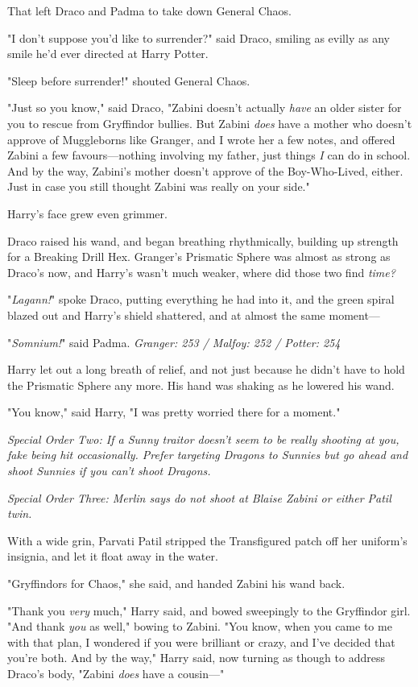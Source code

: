 That left Draco and Padma to take down General Chaos.

"I don't suppose you'd like to surrender?" said Draco, smiling as evilly as any
smile he'd ever directed at Harry Potter.

"Sleep before surrender!" shouted General Chaos.

"Just so you know," said Draco, "Zabini doesn't actually \emph{have} an older
sister for you to rescue from Gryffindor bullies. But Zabini \emph{does} have a
mother who doesn't approve of Muggleborns like Granger, and I wrote her a few
notes, and offered Zabini a few favours---nothing involving my father, just
things \emph{I} can do in school. And by the way, Zabini's mother doesn't
approve of the Boy-Who-Lived, either. Just in case you still thought Zabini was
really on your side."

Harry's face grew even grimmer.

Draco raised his wand, and began breathing rhythmically, building up strength
for a Breaking Drill Hex. Granger's Prismatic Sphere was almost as strong as
Draco's now, and Harry's wasn't much weaker, where did those two find
\emph{time?}

"\emph{Lagann!}" spoke Draco, putting everything he had into it, and the green
spiral blazed out and Harry's shield shattered, and at almost the same moment---

"\emph{Somnium!}" said Padma.
\later
\emph{Granger: 253 / Malfoy: 252 / Potter: 254}

Harry let out a long breath of relief, and not just because he didn't have to
hold the Prismatic Sphere any more. His hand was shaking as he lowered his wand.

"You know," said Harry, "I was pretty worried there for a moment."

\emph{Special Order Two: If a Sunny traitor doesn't seem to be really shooting
at you, fake being hit occasionally. Prefer targeting Dragons to Sunnies but go
ahead and shoot Sunnies if you can't shoot Dragons.}

\emph{Special Order Three: Merlin says do not shoot at Blaise Zabini or either
Patil twin.}

With a wide grin, Parvati Patil stripped the Transfigured patch off her
uniform's insignia, and let it float away in the water.

"Gryffindors for Chaos," she said, and handed Zabini his wand back.

"Thank you \emph{very} much," Harry said, and bowed sweepingly to the
Gryffindor girl. "And thank \emph{you} as well," bowing to Zabini. "You know,
when you came to me with that plan, I wondered if you were brilliant or crazy,
and I've decided that you're both. And by the way," Harry said, now turning as
though to address Draco's body, "Zabini \emph{does} have a cousin---"

